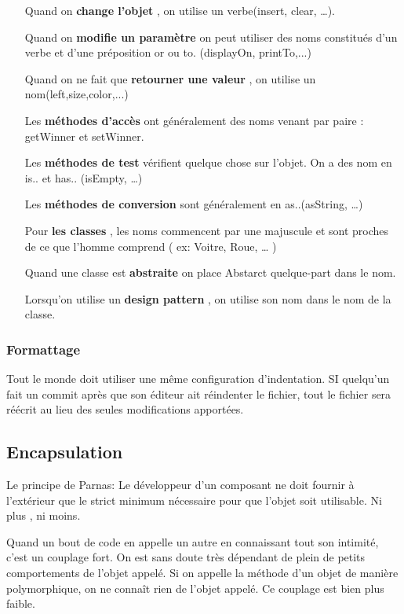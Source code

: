 \begin{itemize}

	\item[Quand on \textbf{change l’objet}], on utilise un verbe(insert, clear, …).
	\item[Quand on \textbf{modifie un paramètre}] on peut utiliser des noms constitués d’un verbe et d’une préposition or ou to. (displayOn, printTo,...) 
	\item[Quand on ne fait que \textbf{retourner une valeur}], on utilise un nom(left,size,color,...)
	\item [Les \textbf{méthodes d’accès}] ont généralement des noms venant par paire : getWinner et setWinner.
	\item[Les \textbf{méthodes de test}] vérifient quelque chose sur l’objet. On a des nom en is.. et has.. (isEmpty, …)
	\item[Les \textbf{méthodes de conversion}] sont généralement en as..(asString, …)
	\item[Pour \textbf{les classes}], les noms commencent par une majuscule et sont proches de ce que l’homme comprend ( ex: Voitre, Roue, … )
	\item[Quand une classe est \textbf{abstraite}] on place Abstarct quelque-part dans le nom.
	\item[Lorsqu’on utilise un \textbf{design pattern}], on utilise son nom dans le nom de la classe.
\end{itemize}

\subsubsection{Formattage}
Tout le monde doit utiliser une même configuration d’indentation.
SI quelqu’un fait un commit après que son éditeur ait réindenter le fichier, tout le fichier sera réécrit au lieu des seules modifications apportées.

\subsection{Encapsulation}
Le principe de Parnas: Le développeur d’un composant ne doit fournir à l’extérieur que le strict minimum nécessaire pour que l’objet soit utilisable. Ni plus , ni moins.

Quand un bout de code en appelle un autre en connaissant tout son intimité, c’est un couplage fort. On est sans doute très dépendant de plein de petits comportements de l’objet appelé.
Si on appelle la méthode d’un objet de manière polymorphique, on ne connaît rien de l’objet appelé. Ce couplage est bien plus faible.

